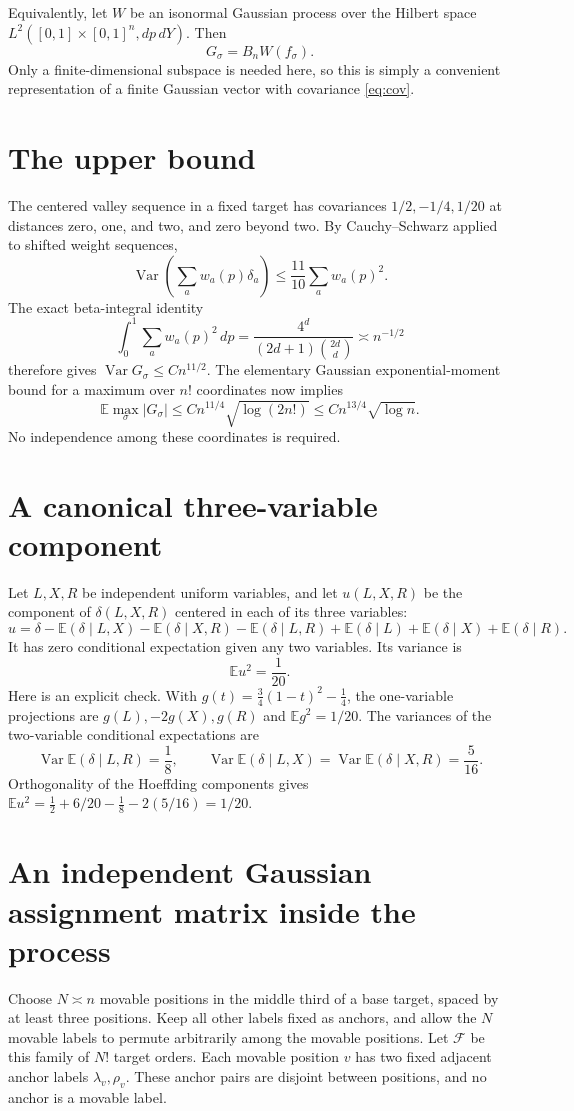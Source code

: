 \documentclass[11pt]{article}
\newcommand{\E}{\mathbb E}
\newcommand{\Var}{\operatorname{Var}}
\begin{document}
Equivalently, let $W$ be an isonormal Gaussian process over the Hilbert
space $L^2([0,1]\times[0,1]^n,dp\,dY)$. Then
\[
 G_\sigma=B_n W(f_\sigma).
\]
Only a finite-dimensional subspace is needed here, so this is simply a
convenient representation of a finite Gaussian vector with covariance
\eqref{eq:cov}.

\section{The upper bound}
The centered valley sequence in a fixed target has covariances
$1/2,-1/4,1/20$ at distances zero, one, and two, and zero beyond two.
By Cauchy--Schwarz applied to shifted weight sequences,
\[
 \Var\left(\sum_aw_a(p)\delta_a\right)
 \leq\frac{11}{10}\sum_aw_a(p)^2.
\]
The exact beta-integral identity
\[
 \int_0^1\sum_aw_a(p)^2\,dp
 =\frac{4^d}{(2d+1)\binom{2d}d}\asymp n^{-1/2}
\]
therefore gives $\Var G_\sigma\leq Cn^{11/2}$.
The elementary Gaussian exponential-moment bound for a maximum over $n!$
coordinates now implies
\[
 \E\max_\sigma|G_\sigma|
 \leq Cn^{11/4}\sqrt{\log(2n!)}
 \leq Cn^{13/4}\sqrt{\log n}.
\]
No independence among these coordinates is required.

\section{A canonical three-variable component}
Let $L,X,R$ be independent uniform variables, and let $u(L,X,R)$ be the
component of $\delta(L,X,R)$ centered in each of its three variables:
\[
 u=\delta-\E(\delta\mid L,X)-\E(\delta\mid X,R)
            -\E(\delta\mid L,R)
       +\E(\delta\mid L)+\E(\delta\mid X)+\E(\delta\mid R).
\]
It has zero conditional expectation given any two variables.
Its variance is
\begin{equation}\label{eq:kappa}
 \E u^2=\frac1{20}.
\end{equation}
Here is an explicit check. With
$g(t)=\tfrac34(1-t)^2-\tfrac14$, the one-variable projections are
$g(L),-2g(X),g(R)$ and $\E g^2=1/20$.
The variances of the two-variable conditional expectations are
\[
 \Var\E(\delta\mid L,R)=\frac18,
 \qquad
 \Var\E(\delta\mid L,X)=\Var\E(\delta\mid X,R)=\frac5{16}.
\]
Orthogonality of the Hoeffding components gives
$\E u^2=\tfrac12+6/20-\tfrac18-2(5/16)=1/20$.

\section{An independent Gaussian assignment matrix inside the process}
Choose $N\asymp n$ movable positions in the middle third of a base target,
spaced by at least three positions. Keep all other labels fixed as anchors,
and allow the $N$ movable labels to permute arbitrarily among the movable
positions. Let $\mathcal F$ be this family of $N!$ target orders.
Each movable position $v$ has two fixed adjacent anchor labels
$\lambda_v,\rho_v$. These anchor pairs are disjoint between positions,
and no anchor is a movable label.
\end{document}
